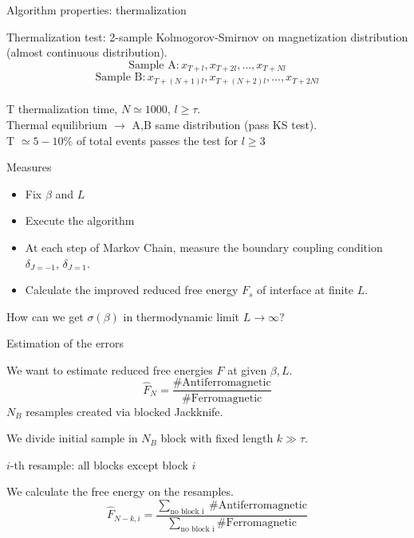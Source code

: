 \documentclass[12pt,handout]{beamer}
\begin{document}
\begin{frame}{Algorithm properties: thermalization}
\begin{center}
Thermalization test: 2-sample Kolmogorov-Smirnov on magnetization distribution (almost continuous distribution).
\[
	\mbox{Sample A}: x_{T+l}, x_{T+2l},\ldots, x_{T+Nl}
\]
\[
	\mbox{Sample B}: x_{T+(N+1)l}, x_{T+(N+2)l}, \ldots, x_{T+2Nl}
\]\\
\vspace{10pt}
T thermalization time, $N \simeq 1000$, $l\ge \tau$.\\
\vspace{10pt}
Thermal equilibrium $\rightarrow$ A,B same distribution (pass KS test).\\
\vspace{10pt}
T $\simeq 5-10\%$ of total events passes the test for $l \ge 3$
\end{center}
\end{frame}

\begin{frame}{Measures}
\begin{center}
\begin{itemize}
\item Fix $\beta$ and $L$
\vspace{10pt}
\item Execute the algorithm
\vspace{10pt}
\item At each step of Markov Chain, measure the boundary coupling condition $\delta _{J =-1}$, $\delta_{J=1}$.
\vspace{10pt}
\item Calculate the improved reduced free energy $F_s$ of interface at finite $L$.
\end{itemize}
\vspace{20pt}
How can we get $\sigma\left(\beta\right)$ in thermodynamic limit $L\rightarrow \infty$?
\end{center}
\end{frame}

\begin{frame}{Estimation of the errors}
\begin{center}
We want to estimate reduced free energies $F$ at given $\beta, L$.
\[
	\hat{F}_N = \frac{\# \text{Antiferromagnetic}}{\# \text{Ferromagnetic}}
\]
$N_B$ resamples created via blocked Jackknife.

We divide initial sample in $N_B$ block with fixed length $k\gg \tau$.

$i$-th resample: all blocks except block $i$

We calculate the free energy on the resamples.
\[
	\hat{F}_{N-k, i} = \frac{\sum_ { \mbox{no block i }} \# \text{Antiferromagnetic} }{\sum_ {\mbox{no block i}} \# \text{Ferromagnetic}}
\]

\end{center}
\end{frame}
\end{document}
